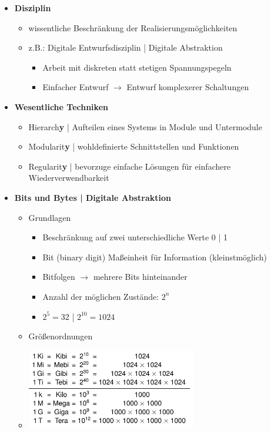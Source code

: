 \documentclass[11pt,a4paper]{article}
\begin{document}
\begin{itemize}
\item \textbf{Disziplin}
	\begin{itemize}
	\item wissentliche Beschränkung der Realisierungsmöglichkeiten
	\item z.B.: Digitale Entwurfsdisziplin | Digitale Abstraktion 
		\begin{itemize}
		\item Arbeit mit diskreten statt stetigen Spannungspegeln
		\item Einfacher Entwurf $\rightarrow$ Entwurf komplexerer Schaltungen
		\end{itemize}
	\end{itemize}

\item \textbf{Wesentliche Techniken}
	\begin{itemize}
	\item Hierarch\textbf{y} | Aufteilen eines Systems in Module und Untermodule
	\item Modularit\textbf{y} | wohldefinierte Schnittstellen und Funktionen
	\item Regularit\textbf{y} | bevorzuge einfache Lösungen für einfachere Wiederverwendbarkeit
	\end{itemize} 

\item \textbf{Bits und Bytes | Digitale Abstraktion}
	\begin{itemize}
	\item Grundlagen 
		\begin{itemize}
		\item Beschränkung auf zwei unterschiedliche Werte 0 | 1
		\item Bit (binary digit) Maßeinheit für Information (kleinstmöglich)
		\item Bitfolgen $\rightarrow$ mehrere Bits hinteinander
		\item Anzahl der möglichen Zustände: $2^n$
		\item $2^5 = 32$ | $2^{10} = 1024$
		\end{itemize}		 
	
	\item Größenordnungen
	\item[] %
				\includegraphics[height=3.5cm]{Bilder/groessenordnung}
		

\end{itemize}
\end{itemize}
\end{document}
